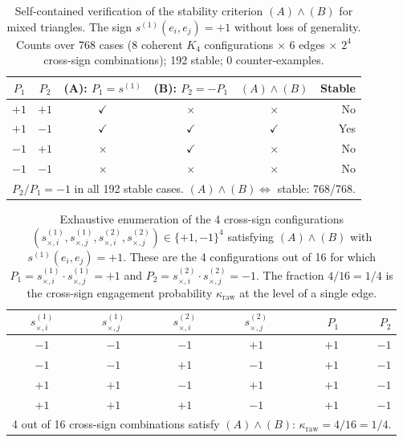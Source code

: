 \documentclass[11pt,a4paper]{article}
\theoremstyle{definition}
\newcommand{\kap}{\kappa}
\begin{document}
\begin{table}[ht]
\centering
\caption{Self-contained verification of the stability criterion $(A)\wedge(B)$ for mixed triangles. The sign $s^{(1)}(e_i,e_j) = +1$ without loss of generality. Counts over 768 cases (8 coherent $K_4$ configurations $\times$ 6 edges $\times$ $2^4$ cross-sign combinations); 192 stable; 0 counter-examples.}

\bigskip

\label{tab:condB}
\begin{tabular}{cccccr}
\toprule
$P_1$ & $P_2$ & (A): $P_1 = s^{(1)}$ & (B): $P_2 = -P_1$ & $(A)\wedge(B)$ & Stable \\
\midrule
$+1$ & $+1$ & $\checkmark$ & $\times$ & $\times$ & No \\
$+1$ & $-1$ & $\checkmark$ & $\checkmark$ & $\checkmark$ & Yes \\
$-1$ & $+1$ & $\times$ & $\checkmark$ & $\times$ & No \\
$-1$ & $-1$ & $\times$ & $\times$ & $\times$ & No \\
\bottomrule
\multicolumn{6}{l}{\small $P_2/P_1 = -1$ in all 192 stable cases. $(A)\wedge(B)\Leftrightarrow$ stable: 768/768.}
\end{tabular}
\end{table}

\begin{table}[ht]
\centering
\caption{Exhaustive enumeration of the 4 cross-sign configurations $(s_{\times,i}^{(1)}, s_{\times,j}^{(1)}, s_{\times,i}^{(2)}, s_{\times,j}^{(2)}) \in \{+1,-1\}^4$ satisfying $(A)\wedge(B)$ with $s^{(1)}(e_i,e_j) = +1$. These are the 4 configurations out of 16 for which $P_1 = s_{\times,i}^{(1)}\cdot s_{\times,j}^{(1)} = +1$ and $P_2 = s_{\times,i}^{(2)}\cdot s_{\times,j}^{(2)} = -1$. The fraction $4/16 = 1/4$ is the cross-sign engagement probability $\kap_{\mathrm{raw}}$ at the level of a single edge.}

\bigskip

\label{tab:ab_configs}
\begin{tabular}{ccccrr}
\toprule
$s_{\times,i}^{(1)}$ & $s_{\times,j}^{(1)}$ & $s_{\times,i}^{(2)}$ & $s_{\times,j}^{(2)}$ & $P_1$ & $P_2$ \\
\midrule
$-1$ & $-1$ & $-1$ & $+1$ & $+1$ & $-1$ \\
$-1$ & $-1$ & $+1$ & $-1$ & $+1$ & $-1$ \\
$+1$ & $+1$ & $-1$ & $+1$ & $+1$ & $-1$ \\
$+1$ & $+1$ & $+1$ & $-1$ & $+1$ & $-1$ \\
\bottomrule
\multicolumn{6}{l}{\small 4 out of 16 cross-sign combinations satisfy $(A)\wedge(B)$: $\kap_{\mathrm{raw}} = 4/16 = 1/4$.}
\end{tabular}
\end{table}
\end{document}
